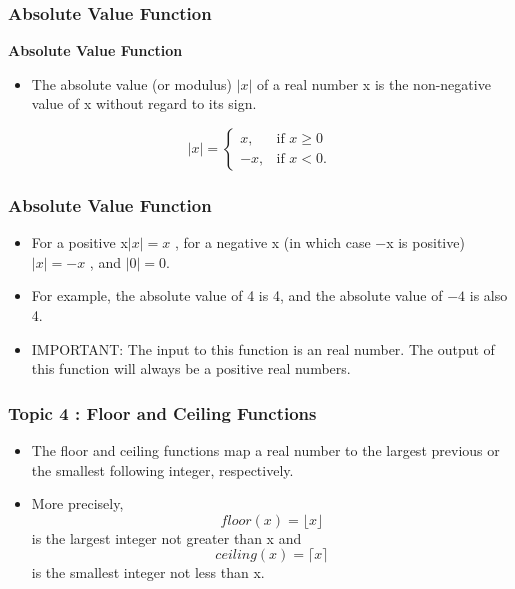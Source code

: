 \begin{itemize}
\begin{frame}
	\frametitle{Absolute Value Function}
	\Large
	\textbf{Absolute Value Function}
	\begin{itemize}
	\item The absolute value (or modulus) $|x|$ of a real number x is the non-negative value of x without regard to its sign. 
	
	\end{itemize}
	\[|x| = \begin{cases} x, & \mbox{if }  x \ge 0  \\ -x,  & \mbox{if } x < 0. \end{cases} \]
\end{frame}
\begin{frame}
	\frametitle{Absolute Value Function}
	\Large
	\vspace{-1cm}
\begin{itemize}

	\item For a positive x$|x| = x$ , for a negative x (in which case −x is positive) $|x| = -x$ , and $|0| = 0$. 
	\item For example, the absolute value of 4 is 4, and the absolute value of $-4$ is also 4. 
	\item IMPORTANT:  The input to this function is an real number. The output of this function will always be a positive real numbers.
\end{itemize}


\end{frame}
\begin{frame}
	\frametitle{Topic 4 : Floor and Ceiling Functions}
	\Large
	\begin{itemize}
	\item The floor and ceiling functions map a real number to the largest previous or the smallest following integer, respectively. \item More precisely, \[floor(x) = \lfloor x\rfloor \] is the largest integer not greater than x and \[ceiling(x) =  \lceil x \rceil \] is the smallest integer not less than x.
	\end{itemize}
	

\end{frame}
\end{itemize}
